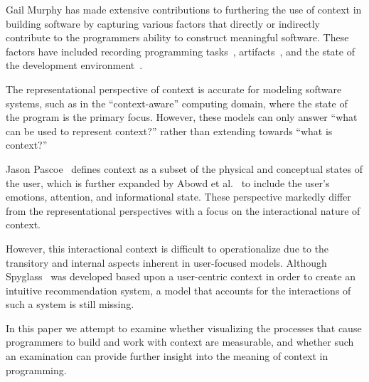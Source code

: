 Gail Murphy has made extensive contributions to furthering the use of context in building software by capturing various factors that directly or indirectly contribute to the programmers ability to construct meaningful software. These factors have included recording programming tasks~\cite{Kersten:2006}, artifacts~\cite{Vcubranic:2003}, and the state of the development environment~\cite{Gasparic:2017}.


The representational perspective of context is accurate for modeling software systems, such as in the ``context-aware'' computing domain, where the state of the program is the primary focus. However, these models can only answer ``what can be used to represent context?'' rather than extending towards ``what is context?''


Jason Pascoe~\citep{Pascoe:1998} defines context as a subset of the physical and conceptual states of the user, which is further expanded by Abowd et al.~\cite{Abowd:1999} to include the user's emotions, attention, and informational state. These perspective markedly differ from the representational perspectives with a focus on the interactional nature of context.


However, this interactional context is difficult to operationalize due to the transitory and internal aspects inherent in user-focused models. Although Spyglass~\cite{Viriyakattiyaporn:2010} was developed based upon a user-centric context in order to create an intuitive recommendation system, a model that accounts for the interactions of such a system is still missing.


In this paper we attempt to examine whether visualizing the processes that cause programmers to build and work with context are measurable, and whether such an examination can provide further insight into the meaning of context in programming. 